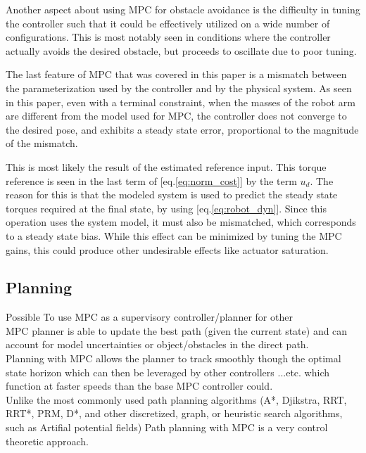 \documentclass[journal]{IEEEtran}
\begin{document}
Another aspect about using MPC for obstacle avoidance is the difficulty in tuning the controller such that it could be effectively utilized on a wide number of configurations. This is most notably seen in conditions where the controller actually avoids the desired obstacle, but proceeds to oscillate due to poor tuning.

The last feature of MPC that was covered in this paper is a mismatch between the parameterization used by the controller and by the physical system. As seen in this paper, even with a terminal constraint, when the masses of the robot arm are different from the model used for MPC, the controller does not converge to the desired pose, and exhibits a steady state error, proportional to the magnitude of the mismatch.

This is most likely the result of the estimated reference input. This torque reference is seen in the last term of [eq.\ref{eq:norm_cost}] by the term $u_d$. The reason for this is that the modeled system is used to predict the steady state torques required at the final state, by using [eq.\ref{eq:robot_dyn}]. Since this operation uses the system model, it must also be mismatched, which corresponds to a steady state bias. While this effect can be minimized by tuning the MPC gains, this could produce other undesirable effects like actuator saturation.


\subsection{Planning}

Possible To use MPC as a supervisory controller/planner for other\\

MPC planner is able to update the best path (given the current state) and can account for model uncertainties or object/obstacles in the direct path.\\

Planning with MPC allows the planner to track smoothly though the optimal state horizon which can then be leveraged by other controllers ...etc. which function at faster speeds than the base MPC controller could.\\

Unlike the most commonly used path planning algorithms (A*, Djikstra, RRT, RRT*, PRM, D*, and other discretized, graph, or heuristic search algorithms, such as Artifial potential fields) Path planning with MPC is a very control theoretic approach.\\
\end{document}

